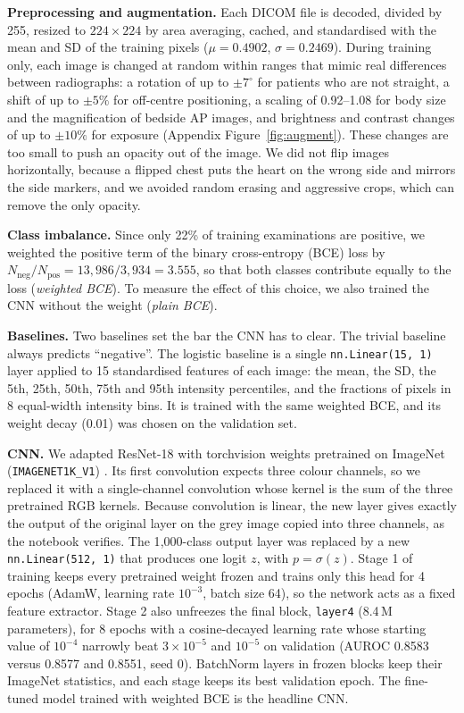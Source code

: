 \documentclass[11pt,a4paper]{article}
\begin{document}
\textbf{Preprocessing and augmentation.} Each DICOM file is decoded, divided by 255, resized to $224\times224$ by area
averaging, cached, and standardised with the mean and SD of the training pixels ($\mu = 0.4902$, $\sigma = 0.2469$).
During training only, each image is changed at random within ranges that mimic real differences between radiographs: a
rotation of up to $\pm7^\circ$ for patients who are not straight, a shift of up to $\pm5\%$ for off-centre positioning, a
scaling of 0.92--1.08 for body size and the magnification of bedside AP images, and brightness and contrast changes of up
to $\pm10\%$ for exposure (Appendix Figure~\ref{fig:augment}). These changes are too small to push an opacity out of the
image. We did not flip images horizontally, because a flipped chest puts the heart on the wrong side and mirrors the side
markers, and we avoided random erasing and aggressive crops, which can remove the only opacity.

\textbf{Class imbalance.} Since only 22\% of training examinations are positive, we weighted the positive term of the
binary cross-entropy (BCE) loss by $N_\text{neg}/N_\text{pos} = 13{,}986/3{,}934 = 3.555$, so that both classes
contribute equally to the loss (\emph{weighted BCE}). To measure the effect of this choice, we also trained the CNN
without the weight (\emph{plain BCE}).

\textbf{Baselines.} Two baselines set the bar the CNN has to clear. The trivial baseline always predicts ``negative''. The
logistic baseline is a single \texttt{nn.Linear(15, 1)} layer applied to 15 standardised features of each image: the
mean, the SD, the 5th, 25th, 50th, 75th and 95th intensity percentiles, and the fractions of pixels in 8 equal-width
intensity bins. It is trained with the same weighted BCE, and its weight decay (0.01) was chosen on the validation set.

\textbf{CNN.} We adapted ResNet-18 \cite{he2016} with torchvision weights pretrained on ImageNet \cite{deng2009}
(\texttt{IMAGENET1K\_V1}) \cite{paszke2019}. Its first convolution expects three colour channels, so we replaced it with a
single-channel convolution whose kernel is the sum of the three pretrained RGB kernels. Because convolution is linear, the
new layer gives exactly the output of the original layer on the grey image copied into three channels, as the notebook
verifies. The 1{,}000-class output layer was replaced by a new \texttt{nn.Linear(512, 1)} that produces one logit $z$,
with $p = \sigma(z)$. Stage 1 of training keeps every pretrained weight frozen and trains only this head for 4 epochs
(AdamW, learning rate $10^{-3}$, batch size 64), so the network acts as a fixed feature extractor. Stage 2 also unfreezes
the final block, \texttt{layer4} (8.4\,M parameters), for 8 epochs with a cosine-decayed learning rate whose starting value
of $10^{-4}$ narrowly beat $3\times10^{-5}$ and $10^{-5}$ on validation (AUROC 0.8583 versus 0.8577 and 0.8551, seed 0).
BatchNorm layers in frozen blocks keep their ImageNet statistics, and each stage keeps its best validation epoch. The
fine-tuned model trained with weighted BCE is the headline CNN.
\end{document}
